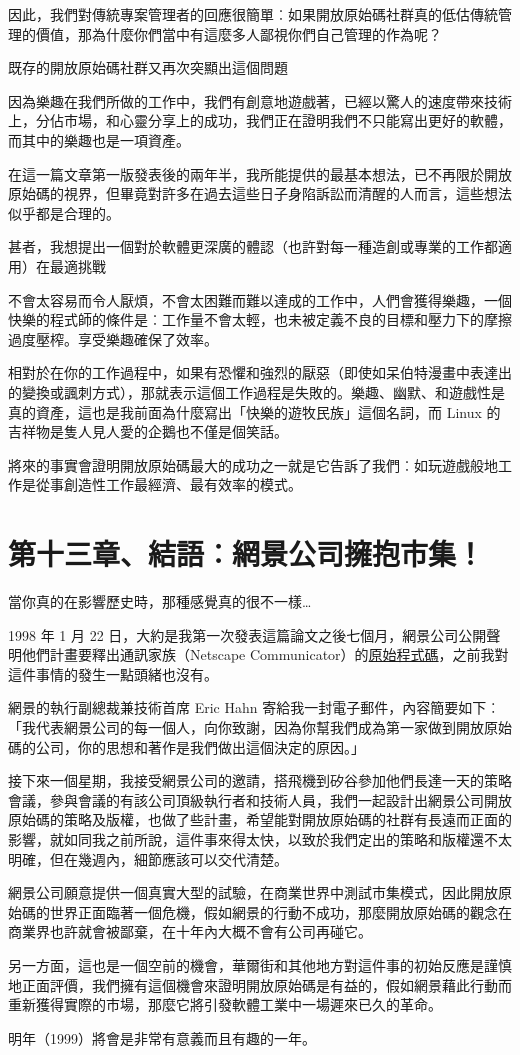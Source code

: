 \documentclass[12pt,]{article}
\makeatletter
\newcommand*{\shifttext}[2]{%
  \settowidth{\@tempdima}{#2}%
  \makebox[\@tempdima]{\hspace*{#1}#2}%
}
\makeatother
\begin{document}
因此，我們對傳統專案管理者的回應很簡單︰如果開放原始碼社群真的低估傳統管理的價值，那為什麼你們當中有這麼多人鄙視你們自己管理的作為呢？

既存的開放原始碼社群又再次突顯出這個問題 \shifttext{1pt}{---}\shifttext{-1pt}{---}
因為樂趣在我們所做的工作中，我們有創意地遊戲著，已經以驚人的速度帶來技術上，分佔市場，和心靈分享上的成功，我們正在證明我們不只能寫出更好的軟體，而其中的樂趣也是一項資產。

在這一篇文章第一版發表後的兩年半，我所能提供的最基本想法，已不再限於開放原始碼的視界，但畢竟對許多在過去這些日子身陷訴訟而清醒的人而言，這些想法似乎都是合理的。

甚者，我想提出一個對於軟體更深廣的體認（也許對每一種造創或專業的工作都適用）在最適挑戰
\shifttext{1pt}{---}\shifttext{-1pt}{---}
不會太容易而令人厭煩，不會太困難而難以達成的工作中，人們會獲得樂趣，一個快樂的程式師的條件是︰工作量不會太輕，也未被定義不良的目標和壓力下的摩擦過度壓榨。享受樂趣確保了效率。

相對於在你的工作過程中，如果有恐懼和強烈的厭惡（即使如呆伯特漫畫中表達出的變換或諷刺方式），那就表示這個工作過程是失敗的。樂趣、幽默、和遊戲性是真的資產，這也是我前面為什麼寫出「快樂的遊牧民族」這個名詞，而
Linux 的吉祥物是隻人見人愛的企鵝也不僅是個笑話。

將來的事實會證明開放原始碼最大的成功之一就是它告訴了我們︰如玩遊戲般地工作是從事創造性工作最經濟、最有效率的模式。

\newpage
\section{第十三章、結語︰網景公司擁抱市集！}

當你真的在影響歷史時，那種感覺真的很不一樣\ldots{}

1998 年 1 月 22
日，大約是我第一次發表這篇論文之後七個月，網景公司公開聲明他們計畫要釋出通訊家族（Netscape
Communicator）的\href{http://www.netscape.com/newsref/pr/newsrelease558.html}{原始程式碼}，之前我對這件事情的發生一點頭緒也沒有。

網景的執行副總裁兼技術首席 Eric Hahn
寄給我一封電子郵件，內容簡要如下︰「我代表網景公司的每一個人，向你致謝，因為你幫我們成為第一家做到開放原始碼的公司，你的思想和著作是我們做出這個決定的原因。」

接下來一個星期，我接受網景公司的邀請，搭飛機到矽谷參加他們長達一天的策略會議，參與會議的有該公司頂級執行者和技術人員，我們一起設計出網景公司開放原始碼的策略及版權，也做了些計畫，希望能對開放原始碼的社群有長遠而正面的影響，就如同我之前所說，這件事來得太快，以致於我們定出的策略和版權還不太明確，但在幾週內，細節應該可以交代清楚。

網景公司願意提供一個真實大型的試驗，在商業世界中測試市集模式，因此開放原始碼的世界正面臨著一個危機，假如網景的行動不成功，那麼開放原始碼的觀念在商業界也許就會被鄙棄，在十年內大概不會有公司再碰它。

另一方面，這也是一個空前的機會，華爾街和其他地方對這件事的初始反應是謹慎地正面評價，我們擁有這個機會來證明開放原始碼是有益的，假如網景藉此行動而重新獲得實際的市場，那麼它將引發軟體工業中一場遲來已久的革命。

明年（1999）將會是非常有意義而且有趣的一年。
\end{document}
